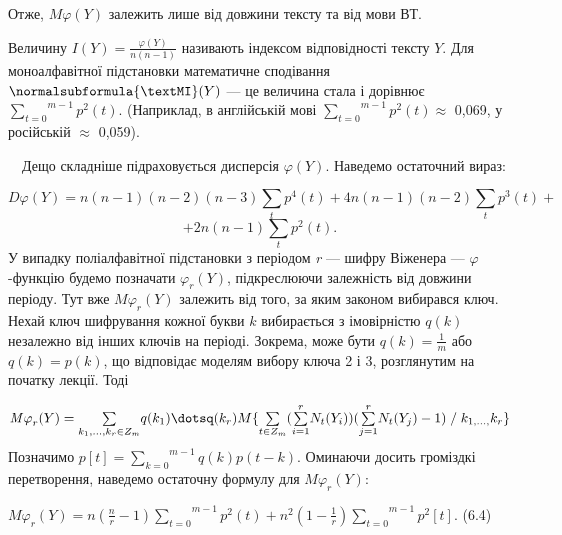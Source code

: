 Отже,  $\mathit{M\varphi }(Y)$ залежить лише від довжини тексту та від мови
ВТ.

 Величину  $I(Y)=\frac{\varphi (Y)}{n(n-1)}$ називають індексом відповідності
тексту  $Y$. Для моноалфавітної підстановки математичне сподівання  
$\normalsubformula{\textMI}(Y)$ \textit{ }--- це величина стала і дорівнює 
$\overset{m-1}{\underset{t=0}{\sum }}{p^2(t)}$. (Наприклад, в
англійській мові  ${\overset{m-1}{\underset{t=0}{\sum
}}{p^{2}(t)}}$$\approx$ 0,069, у російській $\approx$ 0,059).

\ \ Дещо складніше підраховується дисперсія  $\varphi (Y)$. Наведемо
остаточний вираз:

\begin{equation*}
{\mathit{D\varphi }(Y)=n(n-1)(n-2)(n-3)\underset{t}{\sum
}{p^{4}(t)+4n(n-1)(n-2)\underset{t}{\sum }{p^{3}(t)+}}}
\end{equation*}
\begin{equation*}
{+2n(n-1)\underset{t}{\sum }{p^{2}(t)}\text{.}}
\end{equation*}
У випадку поліалфавітної підстановки з періодом \textit{r}\textit{ }--- шифру
Віженера ---  $\varphi ${}-функцію будемо позначати  $\varphi _r(Y)$,
підкреслюючи залежність від довжини періоду. Тут вже  ${\mathit{M\varphi
}_{r}(Y)}$ залежить від того, за яким законом вибирався ключ. Нехай ключ
шифрування кожної букви  $k$ вибирається з імовірністю  $q(k)$ незалежно
від інших ключів на періоді. Зокрема, може бути  $q(k)=\frac{1}m$ або 
$q(k)=p(k)$, що відповідає моделям вибору ключа 2 і 3, розглянутим на початку
лекції. Тоді 

\begin{equation*}
\begin{matrix}{\mathit{M\varphi
}_{r}(Y)=\underset{k_{1},\dots,k_{r}\in Z_{m}}{\sum
}{q(k_{1})\dotsq(k_{r})M\{\underset{t\in Z_{{m}}}{\sum
}{(\overset{r}{\underset{i=1}{\sum
}}{N_{t}(Y_{i}))(\overset{r}{\underset{j=1}{\sum
}}{N_{t}(Y_{j})-1)\;/\;k_{1,\dots,}k_{r}}}}\}}}\hfill\null
\end{matrix}\hfill 
\end{equation*}
Позначимо  $p[t]=\overset{m-1}{\underset{k=0}{\sum }}{q(k)p(t-k)}$.
Оминаючи досить громіздкі перетворення, наведемо остаточну формулу для 
$\mathit{M\varphi }_r(Y)$:


\bigskip

{\raggedleft
  ${\mathit{M\varphi
}_{r}(Y)=n(\frac{n}{r}-1)\overset{m-1}{\underset{t=0}{\sum
}}{p^{2}(t)+n^{2}(1-\frac{1}{r})}\overset{m-1}{\underset{t=0}{\sum
}}{p^{2}[t]}}$.  (6.4)
\par}

